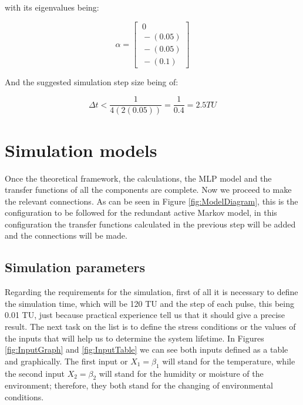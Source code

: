 \documentclass{article}
\begin{document}
\begin{doublespacing}
\par with its eigenvalues being:

\begin{equation}
\alpha = 
\begin{bmatrix}
\ 0 \\
\ - (0.05) \\
\ - (0.05) \\
\ - (0.1)
\end{bmatrix}
\end{equation}

\par And the suggested simulation step size being of:

\begin{equation}
\Delta t< \frac{1}{4 (2 (0.05))} = \frac{1}{0.4}=2.5 TU
\end{equation}



\newpage

\section{Simulation models}

\par Once the theoretical framework, the calculations, the MLP model and the transfer functions of all the components are complete. Now we proceed to make the relevant connections. As can be seen in Figure \ref{fig:ModelDiagram}, this is the configuration to be followed for the redundant active Markov model, in this configuration the transfer functions calculated in the previous step will be added and the connections will be made.

\subsection{Simulation parameters}

\par Regarding the requirements for the simulation, first of all it is necessary to define the simulation time, which will be 120 TU and the step of each pulse, this being 0.01 TU, just because practical experience tell us that it should give a precise result. The next task on the list is to define the stress conditions or the values of the inputs that will help us to determine the system lifetime. In Figures \ref{fig:InputGraph} and \ref{fig:InputTable} we can see both inputs defined as a table and graphically. The first input or $ X_1 = \beta_1$ will stand for the temperature, while the second input  $ X_2 = \beta_2$ will stand for the humidity or moisture of the environment; therefore, they both stand for the changing of environmental conditions.


\end{doublespacing}
\end{document}

